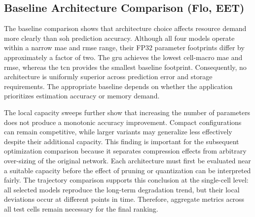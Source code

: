 \documentclass[final,3p,times]{elsarticle}
\begin{document}
\subsection{Baseline Architecture Comparison (Flo, EET)}
The baseline comparison shows that architecture choice affects resource demand more clearly than \ac{soh} prediction accuracy. Although all four models operate within a narrow \ac{mae} and \ac{rmse} range, their FP32 parameter footprints differ by approximately a factor of two. The \ac{gru} achieves the lowest cell-macro \ac{mae} and \ac{rmse}, whereas the \ac{tcn} provides the smallest baseline footprint. Consequently, no architecture is uniformly superior across prediction error and storage requirements. The appropriate baseline depends on whether the application prioritizes estimation accuracy or memory demand.

The local capacity sweeps further show that increasing the number of parameters does not produce a monotonic accuracy improvement. Compact configurations can remain competitive, while larger variants may generalize less effectively despite their additional capacity. This finding is important for the subsequent optimization comparison because it separates compression effects from arbitrary over-sizing of the original network. Each architecture must first be evaluated near a suitable capacity before the effect of pruning or quantization can be interpreted fairly. The trajectory comparison supports this conclusion at the single-cell level: all selected models reproduce the long-term degradation trend, but their local deviations occur at different points in time. Therefore, aggregate metrics across all test cells remain necessary for the final ranking.

\end{document}
